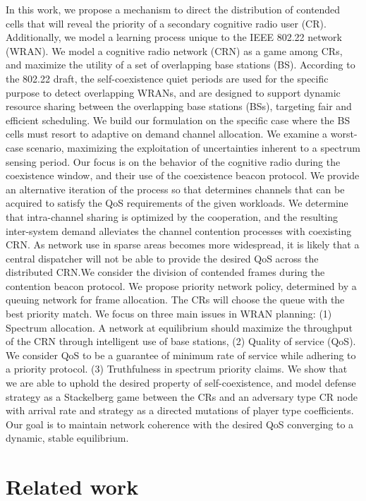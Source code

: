 \documentclass[10pt]{article}
\theoremstyle{definition}
\begin{document}
In this work, we propose a mechanism to direct the distribution of contended cells that 
will reveal the priority of a secondary cognitive radio user (CR). Additionally, we model 
a learning process unique to the IEEE 802.22 network 
(WRAN). We model a cognitive radio network (CRN) as a game among CRs, and maximize the
 utility of a set of overlapping base stations (BS). According to the 802.22 draft, the 
self-coexistence quiet periods are used for the specific purpose to detect overlapping 
WRANs, and are designed to support dynamic resource sharing between the overlapping base
 stations (BSs), targeting fair and efficient scheduling. We build our formulation on 
the specific case where the BS cells must resort to adaptive on demand channel allocation.
 We examine a worst-case scenario, maximizing the exploitation of uncertainties inherent 
to a spectrum sensing period. Our focus is on the behavior of the cognitive radio 
during the coexistence window, and their use of the coexistence beacon protocol. 
We provide an alternative iteration of the process so that determines channels 
that can be acquired to satisfy the QoS requirements of the given workloads. We 
determine that intra-channel sharing is optimized by the cooperation, and the resulting 
inter-system demand alleviates the channel contention processes with coexisting CRN. 
As network use in sparse areas becomes more widespread, it is likely that a 
central dispatcher will not be able to provide the desired QoS across the distributed 
CRN.We consider the division of contended frames during the contention beacon protocol. 
We propose priority network policy, determined by a queuing network for frame 
allocation. The CRs will choose the queue with the best priority match. We focus on 
three main issues in WRAN planning: (1) Spectrum allocation. A network at equilibrium 
should maximize the throughput of the CRN through intelligent use of base stations, 
(2) Quality of service (QoS). We consider QoS to be a guarantee of minimum rate of 
service while adhering to a priority protocol. (3) Truthfulness in spectrum 
priority claims. We show that we are able to uphold the desired property of 
self-coexistence, and model defense strategy as a Stackelberg game between the CRs and 
an adversary type CR node with arrival rate and strategy as a directed mutations of 
player type coefficients. Our goal is to maintain network coherence with the desired 
QoS converging to a dynamic, stable equilibrium.

\section{Related work}
\end{document}
